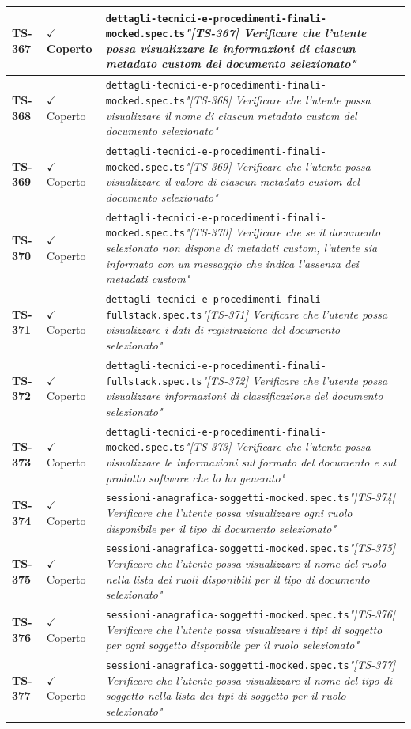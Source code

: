 \documentclass[a4paper,12pt]{article}
\newcommand{\ok}{\textcolor{green!60!black}{$\checkmark$ Coperto}}
\newcommand{\f}[1]{\nolinkurl{#1}\newline}
\newcommand{\q}[1]{\textit{#1}}
\begin{document}
\begin{longtable}{|p{1.5cm}|p{3.0cm}|p{10.5cm}|}
\textbf{TS-367} & \ok & \f{dettagli-tecnici-e-procedimenti-finali-mocked.spec.ts}\q{"[TS-367] Verificare che l'utente possa visualizzare le informazioni di ciascun metadato custom del documento selezionato"} \\ \hline
\textbf{TS-368} & \ok & \f{dettagli-tecnici-e-procedimenti-finali-mocked.spec.ts}\q{"[TS-368] Verificare che l'utente possa visualizzare il nome di ciascun metadato custom del documento selezionato"} \\ \hline
\textbf{TS-369} & \ok & \f{dettagli-tecnici-e-procedimenti-finali-mocked.spec.ts}\q{"[TS-369] Verificare che l'utente possa visualizzare il valore di ciascun metadato custom del documento selezionato"} \\ \hline
\textbf{TS-370} & \ok & \f{dettagli-tecnici-e-procedimenti-finali-mocked.spec.ts}\q{"[TS-370] Verificare che se il documento selezionato non dispone di metadati custom, l'utente sia informato con un messaggio che indica l'assenza dei metadati custom"} \\ \hline
\textbf{TS-371} & \ok & \f{dettagli-tecnici-e-procedimenti-finali-fullstack.spec.ts}\q{"[TS-371] Verificare che l'utente possa visualizzare i dati di registrazione del documento selezionato"} \\ \hline
\textbf{TS-372} & \ok & \f{dettagli-tecnici-e-procedimenti-finali-fullstack.spec.ts}\q{"[TS-372] Verificare che l'utente possa visualizzare informazioni di classificazione del documento selezionato"} \\ \hline
\textbf{TS-373} & \ok & \f{dettagli-tecnici-e-procedimenti-finali-mocked.spec.ts}\q{"[TS-373] Verificare che l'utente possa visualizzare le informazioni sul formato del documento e sul prodotto software che lo ha generato"} \\ \hline
\textbf{TS-374} & \ok & \f{sessioni-anagrafica-soggetti-mocked.spec.ts}\q{"[TS-374] Verificare che l'utente possa visualizzare ogni ruolo disponibile per il tipo di documento selezionato"} \\ \hline
\textbf{TS-375} & \ok & \f{sessioni-anagrafica-soggetti-mocked.spec.ts}\q{"[TS-375] Verificare che l'utente possa visualizzare il nome del ruolo nella lista dei ruoli disponibili per il tipo di documento selezionato"} \\ \hline
\textbf{TS-376} & \ok & \f{sessioni-anagrafica-soggetti-mocked.spec.ts}\q{"[TS-376] Verificare che l'utente possa visualizzare i tipi di soggetto per ogni soggetto disponibile per il ruolo selezionato"} \\ \hline
\textbf{TS-377} & \ok & \f{sessioni-anagrafica-soggetti-mocked.spec.ts}\q{"[TS-377] Verificare che l'utente possa visualizzare il nome del tipo di soggetto nella lista dei tipi di soggetto per il ruolo selezionato"} \\ \hline

\end{longtable}
\end{document}
